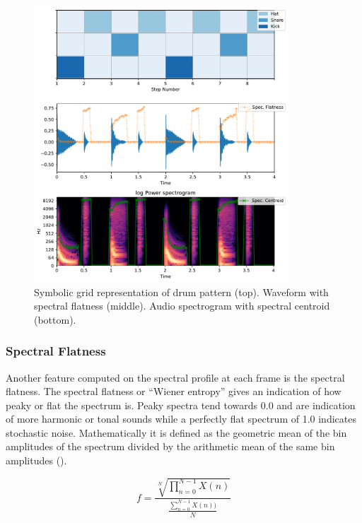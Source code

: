 {{\begin{figure}
	\begin{center}
		\includegraphics[width=0.85\textwidth]{ch05_pyconcat/figures/spectral_features.pdf}
	\end{center}
	\caption[Spectral features of a drum pattern]{Symbolic grid representation of drum pattern (top). Waveform with spectral flatness (middle). Audio spectrogram with spectral centroid (bottom).}
	\label{fig:spectral_features}
\end{figure}

\subsubsection{Spectral Flatness}

Another feature computed on the spectral profile at each frame is the spectral flatness. The spectral flatness or ``Wiener entropy'' gives an indication of how peaky or flat the spectrum is. Peaky spectra tend towards 0.0 and are indication of more harmonic or tonal sounds while a perfectly flat spectrum of 1.0 indicates stochastic noise. Mathematically it is defined as the geometric mean of the bin amplitudes of the spectrum divided by the arithmetic mean of the same bin amplitudes (). 

\begin{equation}
\label{eq:flatness}	
f=\frac{\sqrt[N]{\prod_{n=0}^{N-1}X(n)}}{\frac{\sum_{n=0}^{N-1}X(n))}{N}}
\end{equation}

}}
